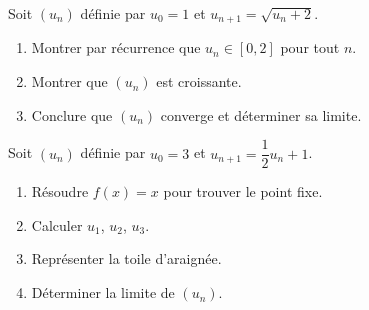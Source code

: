 \begin{exercice}
  Soit $(u_n)$ d\'{e}finie par $u_0 = 1$ et $u_{n+1} = \sqrt{u_n + 2}$.
  \begin{enumerate}
    \item Montrer par r\'{e}currence que $u_n \in [0, 2]$ pour tout $n$.
    \item Montrer que $(u_n)$ est croissante.
    \item Conclure que $(u_n)$ converge et d\'{e}terminer sa limite.
  \end{enumerate}
\end{exercice}

\begin{exercice}
  Soit $(u_n)$ d\'{e}finie par $u_0 = 3$ et $u_{n+1} = \dfrac{1}{2}u_n + 1$.
  \begin{enumerate}
    \item R\'{e}soudre $f(x) = x$ pour trouver le point fixe.
    \item Calculer $u_1$, $u_2$, $u_3$.
    \item Repr\'{e}senter la toile d'araign\'{e}e.
    \item D\'{e}terminer la limite de $(u_n)$.
  \end{enumerate}
\end{exercice}